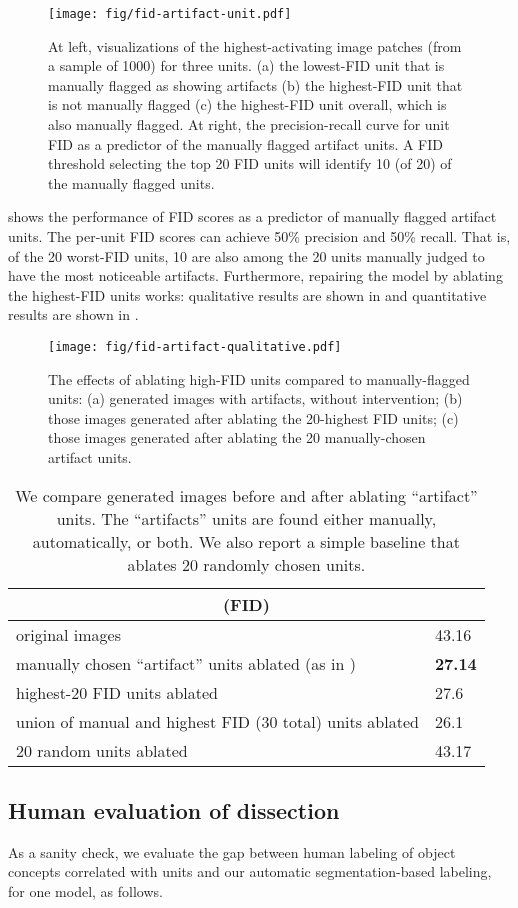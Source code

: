 \documentclass{article} %
\begin{document}
\begin{figure}[t]
\texttt{[image: fig/fid-artifact-unit.pdf]}
\vspace{-15pt}
\caption{At left, visualizations of the highest-activating image patches (from a sample of 1000) for three units.  (a) the lowest-FID unit that is manually flagged as showing artifacts (b) the highest-FID unit that is not manually flagged (c) the highest-FID unit overall, which is also manually flagged.  At right, the precision-recall curve for unit FID as a predictor of the manually flagged artifact units.  A FID threshold selecting the top 20 FID units will identify 10 (of 20) of the manually flagged units.}
\end{figure} shows the performance of FID scores as a predictor of manually flagged artifact units.  The per-unit FID scores can achieve 50\% precision and 50\% recall.  That is, of the 20 worst-FID units, 10 are also among the 20 units manually judged to have the most noticeable artifacts.  Furthermore, repairing the model by ablating the highest-FID units works: qualitative results are shown in  and quantitative results are shown in .

\begin{figure}
\texttt{[image: fig/fid-artifact-qualitative.pdf]}
\vspace{-15pt}
\caption{The effects of ablating high-FID units compared to manually-flagged units: (a) generated images with artifacts, without intervention; (b) those images generated after ablating the 20-highest FID units; (c) those images generated after ablating the 20 manually-chosen artifact units.}
\end{figure}\begin{table}[t]
	\small
	\centering
	\caption{We compare generated images before and after ablating ``artifact'' units. The ``artifacts''  units are found either manually, automatically, or both.  We also report a simple baseline that ablates $20$ randomly chosen units.}
		\vspace{-5pt}

	\begin{tabularx}{250pt}{ll}
		\toprule
	 \multicolumn{2}{c}{\fid (FID)}	\tabularnewline\midrule
original images		  & 43.16    	\tabularnewline
		manually chosen ``artifact'' units ablated (as in {artifacts})		  & {\bf 27.14}   		\tabularnewline
		highest-20 FID  units ablated		  & 27.6   		\tabularnewline
		union of manual and highest FID (30 total) units ablated		  & 26.1   		\tabularnewline
		$20$ random units ablated      & 43.17
		\tabularnewline\bottomrule
	\end{tabularx}
\end{table}\subsection{Human evaluation of dissection}
As a sanity check, we evaluate the gap between human labeling of object concepts correlated with units and our automatic segmentation-based labeling, for one model, as follows.
\end{document}
